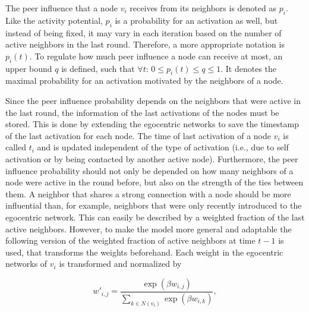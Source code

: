 The peer influence that a node \(v_{i} \) receives from its neighbors is denoted as \( p_{i} \).
Like the activity potential, \( p_{i} \) is a probability for an activation as well, but instead of being fixed, it may vary in each iteration based on the number of active neighbors in the last round.
Therefore, a more appropriate notation is \( p_{i}(t) \).
To regulate how much peer influence a node can receive at most, an upper bound \( q \) is defined, such that \( \forall t: \, 0 \leq p_{i}(t) \leq q \leq 1 \).
It denotes the maximal probability for an activation motivated by the neighbors of a node.

Since the peer influence probability depends on the neighbors that were active in the last round, the information of the last activations of the nodes must be stored.
This is done by extending the egocentric networks to save the timestamp of the last activation for each node.
The time of last activation of a node \( v_{i} \) is called \( t_{i} \) and is updated independent of the type of activation (i.e., due to self activation or by being contacted by another active node).
Furthermore, the peer influence probability should not only be depended on how many neighbors of a node were active in the round before, but also on the strength of the ties between them.
A neighbor that shares a strong connection with a node should be more influential than, for example, neighbors that were only recently introduced to the egocentric network.
This can easily be described by a weighted fraction of the last active neighbors.
However, to make the model more general and adaptable the following version of the weighted fraction of active neighbors at time \(t - 1\) is used, that transforms the weights beforehand.
Each weight in the egocentric networks of \( v_{i} \) is transformed and normalized by

\begin{equation}
    w'_{i,j} = \frac{\exp(\beta w_{i,j})}{\sum_{k \in N(v_{i})} \exp(\beta w_{i,k})},
\end{equation}

